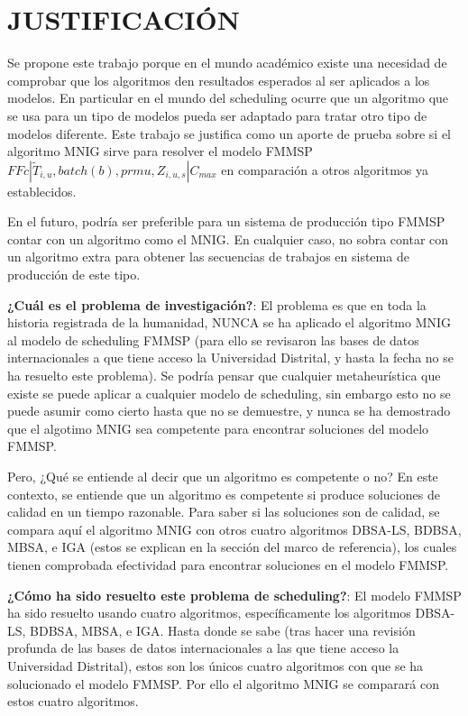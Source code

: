 \documentclass{article}
\def\notac_modelo{$FFc | \tilde{T}_{i, u}, batch(b), prmu, Z_{i, u, s} | C_{max}$}
\begin{document}
\section{JUSTIFICACIÓN}

Se propone este trabajo porque en el mundo académico existe una necesidad de comprobar que los algoritmos den resultados esperados al ser aplicados a los modelos. En particular en el mundo del scheduling ocurre que un algoritmo que se usa para un tipo de modelos pueda ser adaptado para tratar otro tipo de modelos diferente. Este trabajo se justifica como un aporte de prueba sobre si el algoritmo MNIG sirve para resolver el modelo FMMSP \notac_modelo en comparación a otros algoritmos ya establecidos.

\vspace{\baselineskip}
En el futuro, podría ser preferible para un sistema de producción tipo \linebreak FMMSP contar con un algoritmo como el MNIG. En cualquier caso, no sobra contar con un algoritmo extra para obtener las secuencias de trabajos en sistema de producción de este tipo.

\vspace{\baselineskip}
\textbf{¿Cuál es el problema de investigación?}: El problema es que en toda la historia registrada de la humanidad, NUNCA se ha aplicado el algoritmo MNIG al modelo de scheduling FMMSP (para ello se revisaron las bases de datos internacionales a que tiene acceso la Universidad Distrital, y hasta la fecha no se ha resuelto este problema). Se podría pensar que cualquier metaheurística que existe se puede aplicar a cualquier modelo de scheduling, sin embargo esto no se puede asumir como cierto hasta que no se demuestre, y nunca se ha demostrado que el algotimo MNIG sea competente para encontrar soluciones del modelo FMMSP.

\vspace{\baselineskip}
Pero, ¿Qué se entiende al decir que un algoritmo es competente o no? En este contexto, se entiende que un algoritmo es competente si produce soluciones de calidad en un tiempo razonable. Para saber si las soluciones son de calidad, se compara aquí el algoritmo MNIG con otros cuatro algoritmos DBSA-LS, BDBSA, MBSA, e IGA (estos se explican en la sección del marco de referencia), los cuales tienen comprobada efectividad para encontrar soluciones en el modelo FMMSP.

\vspace{\baselineskip}
\textbf{¿Cómo ha sido resuelto este problema de scheduling?}: El modelo FMMSP ha sido resuelto usando cuatro algoritmos, específicamente los algoritmos DBSA-LS, BDBSA, MBSA, e IGA. Hasta donde se sabe (tras hacer una revisión profunda de las bases de datos internacionales a las que tiene acceso la Universidad Distrital), estos son los únicos cuatro algoritmos con que se ha solucionado el modelo FMMSP. Por ello el algoritmo MNIG se comparará con estos cuatro algoritmos.
\end{document}
